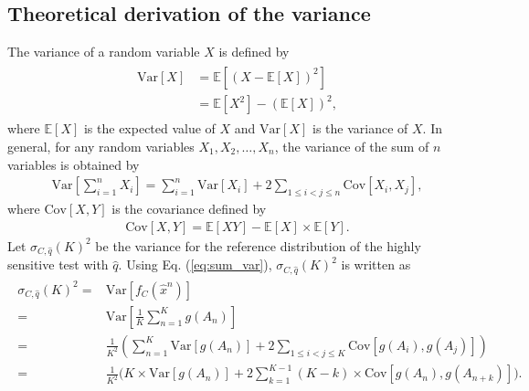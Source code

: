\documentclass[dvipdfmx,english]{ampmt} %
\begin{document}
\subsection{Theoretical derivation of the variance}
The variance of a random variable $X$ is defined by
\begin{align}
\begin{split}\label{eq:var_def}
  \mathrm{Var}[X] &= \mathbb{E}[(X - \mathbb{E}[X])^2] \\
  &=\mathbb{E}[X^2] - (\mathbb{E}[X])^2,
\end{split}
\end{align}
where $\mathbb{E}[X]$ is the expected value of $X$ and $\mathrm{Var}[X]$ is the variance of $X$.
In general, for any random variables $X_1,X_2,\dots,X_n$, the variance of the sum of $n$ variables is obtained by
\begin{align}\label{eq:sum_var}
  \mathrm{Var}\left[\sum_{i=1}^{n} X_i \right] = \sum_{i=1}^{n} \mathrm{Var}[X_i] + 2 \sum_{1\leq i < j \leq n}\mathrm{Cov}[X_i, X_j],
\end{align}
where $\mathrm{Cov}[X,Y]$ is the covariance defined by
\begin{align}\label{eq:cov_def}
  \mathrm{Cov}[X, Y] = \mathbb{E}[XY] - \mathbb{E}[X] \times \mathbb{E}[Y].
\end{align}
Let $\sigma_{C,\hat{q}}(K)^2$ be the variance for the reference distribution of the highly sensitive test with $\hat{q}$.
Using Eq. (\ref{eq:sum_var}), $\sigma_{C,\hat{q}}(K)^2$ is written as
\begin{align}
\begin{split}\label{eq:var_fC}
  \sigma_{C,\hat{q}}(K)^2 =& \mathrm{Var} [f_C(\hat{x}^n)] \\
  =& \mathrm{Var} \left[ \frac{1}{K} \sum_{n=1}^{K} g(A_n) \right] \\
  =& \frac{1}{K^2} \left( \sum_{n=1}^{K} \mathrm{Var} [g(A_n)] + 2 \sum_{1 \leq i < j \leq K} \mathrm{Cov} [g(A_{i}), g(A_{j})] \right) \\
  =& \frac{1}{K^2} \Biggl( K \times \mathrm{Var} [g(A_n)] + 2\sum_{k=1}^{K-1}(K-k) \times \mathrm{Cov}[g(A_n),g(A_{n+k})] \Biggr).
\end{split}
\end{align}
\end{document}
